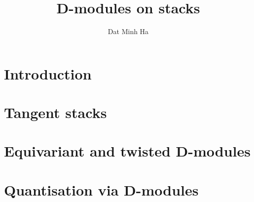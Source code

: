 

\setcounter{section}{-1}





    \title{D-modules on stacks}
    
    \author{Dat Minh Ha}
    \maketitle
    
    \begin{abstract}
        
    \end{abstract}
    
    {
      \hypersetup{} 
      \tableofcontents %
    }

    \section{Introduction}

    \section{Tangent stacks}

    \section{Equivariant and twisted D-modules}

    \section{Quantisation via D-modules}
    
    \printbibliography

